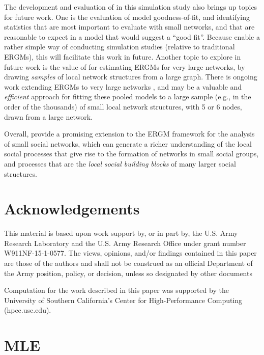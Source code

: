 \documentclass[review]{elsarticle}
\begin{document}
The development and evaluation of \ergmitos{} in this simulation study also brings up topics for future work. One is the evaluation of model goodness-of-fit, and identifying statistics that are most important to evaluate with small networks, and that are reasonable to expect in a model that would suggest a ``good fit''. Because \ergmitos{} enable a rather simple way of conducting simulation studies (relative to traditional ERGMs), this will facilitate this work in future. Another topic to explore in future work is the value of \ergmitos{} for estimating ERGMs for very large networks, by drawing \textit{samples} of local network structures from a large graph. There is ongoing work extending ERGMs to very large networks \cite{stivala2019exponential,STIVALA2016167}, and \ergmitos{} may be a valuable and \textit{efficient} approach for fitting these pooled models to a large sample (e.g., in the order of the thousands) of small local network structures, with 5 or 6 nodes, drawn from a large network. 

Overall,  \ergmitos{} provide a promising extension to the ERGM framework for the analysis of small social networks, which can generate a richer understanding of the local social processes that give rise to the formation of networks in small social groups, and processes that are the \textit{local social building blocks} of many larger social structures. 

\section{Acknowledgements}

This material is based upon work support by, or in part by, the U.S. Army Research Laboratory and the U.S. Army Research Office under grant number W911NF-15-1-0577. The views, opinions, and/or findings contained in this paper are those of the authors and shall not be construed as an official Department of the Army position, policy, or decision, unless so designated by other documents

Computation for the work described in this paper was supported by the University of Southern California’s Center for High-Performance Computing (hpcc.usc.edu).

\nocite{VegaYon2019,R,butts2016,Wickham2016,Leifeld2013}
\printbibliography

\appendix

\section{MLE\label{appendix:mle}}
\end{document}

